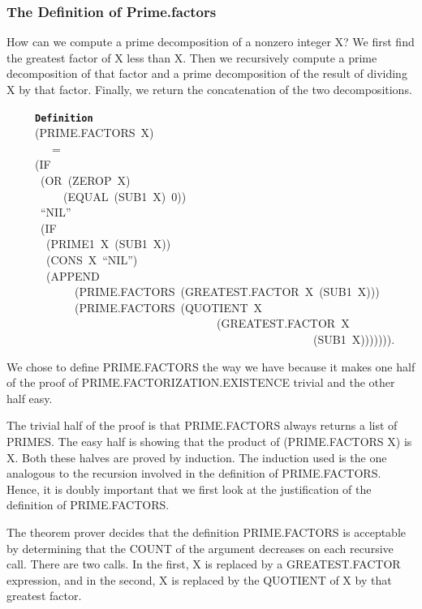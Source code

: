 \documentclass[11pt]{book}
\newenvironment{pubasis}{\begin{flushleft}\ttfamily\small}{\normalsize\rmfamily\end{flushleft}}
\newcommand{\axiomordefinition}[1]{\vspace{6pt}\texttt{\textbf{#1}}}
\newcommand{\pubdefaulttextsize}{\large}
\begin{document}
\subsubsection{The Definition of Prime.factors}
\pubdefaulttextsize
How can we compute a prime
decomposition of a nonzero integer X?
We  first find the greatest factor of
X less than X.  Then we  recursively compute a  prime decomposition of
that factor and a prime decomposition of the result of dividing X by that factor.  Finally, we return the concatenation of the two decompositions.
\begin{pubasis}
~~~~~\axiomordefinition{Definition}\\
~~~~~(PRIME.FAC\-TORS~X)\\
~~~~~~~~=\\
~~~~~(IF\\
~~~~~~(OR~(ZEROP~X)\\
~~~~~~~~~~(EQUAL~(SUB1~X)~0))\\
~~~~~~``NIL''\\
~~~~~~(IF\\
~~~~~~~(PRIME1~X~(SUB1~X))\\
~~~~~~~(CONS~X~``NIL'')\\
~~~~~~~(APPEND\\
~~~~~~~~~~~~(PRIME.FAC\-TORS~(GREAT\-EST.FAC\-TOR~X~(SUB1~X)))\\
~~~~~~~~~~~~(PRIME.FAC\-TORS~(QUOTIENT~X\\
~~~~~~~~~~~~~~~~~~~~~~~~~~~~~~~~~~~~~(GREAT\-EST.FAC\-TOR~X\\
~~~~~~~~~~~~~~~~~~~~~~~~~~~~~~~~~~~~~~~~~~~~~~~~~~~~~~(SUB1~X))))))).\\
\end{pubasis}
We chose to define PRIME.FAC\-TORS the way we have
because it makes one half of the proof of PRIME.FAC\-TOR\-I\-ZA\-TION.EXISTENCE trivial
and the other half easy.  

The trivial half of the
proof is that PRIME.FAC\-TORS always returns a list
of PRIMES.  The easy half is showing that 
the product of (PRIME.FAC\-TORS X) is X.
Both these halves are proved by induction.
The induction used is the one analogous
to the recursion involved in the
definition of PRIME.FAC\-TORS.  Hence, it
is doubly important that we first look
at the justification of the definition of PRIME.FAC\-TORS.

The theorem prover decides that the definition
PRIME.FAC\-TORS is acceptable by determining that
the COUNT of the argument decreases on
each recursive call.  There are two calls.  In the first, X is replaced by
a GREAT\-EST.FAC\-TOR expression, and in the second, X is replaced
by the QUOTIENT of X by that greatest factor.
\end{document}
